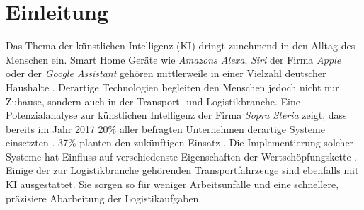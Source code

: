 
\chapter{Einleitung}
\label{ch: Einleitung}
	

		Das Thema der künstlichen Intelligenz (KI) dringt zunehmend in den Alltag des Menschen ein. Smart Home Geräte wie \textit{Amazons Alexa}, \textit{Siri} der Firma \textit{Apple} oder der \textit{Google Assistant} gehören mittlerweile in einer Vielzahl deutscher Haushalte \cite{bvdw}. Derartige Technologien begleiten den Menschen jedoch nicht nur Zuhause, sondern auch in der Transport- und Logistikbranche. Eine Potenzialanalyse zur künstlichen Intelligenz der Firma \textit{Sopra Steria} zeigt, dass bereits im Jahr 2017 20\% aller befragten Unternehmen derartige Systeme einsetzten \cite{sopra}. 37\% planten den zukünftigen Einsatz \cite{sopra}. Die Implementierung solcher Systeme hat Einfluss auf verschiedenste Eigenschaften der Wertschöpfungskette \cite{sopra}. Einige der zur Logistikbranche gehörenden Transportfahrzeuge sind ebenfalls mit KI ausgestattet. Sie sorgen so für weniger Arbeitsunfälle und eine schnellere, präzisiere Abarbeitung der Logistikaufgaben.\\
		

